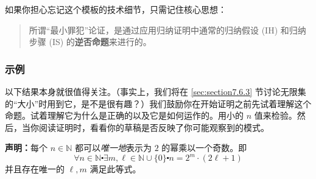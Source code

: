 \setlength{\fboxrule}{2pt}
\setlength\fboxsep{5mm}
\begin{center}
\noindent {}
\end{center}

如果你担心忘记这个模板的技术细节，只需记住核心思想：
\begin{quotation}
    所谓``最小罪犯''论证，是通过应用归纳证明中通常的归纳假设 (IH) 和归纳步骤 (IS) 的\textbf{逆否命题}来进行的。
\end{quotation}

\subsubsection*{示例}

以下结果本身就很值得关注。（事实上，我们将在 \ref{sec:section7.6.3} 节讨论无限集的``大小''时用到它，是不是很有趣？）我们鼓励你在开始证明之前先试着理解这个命题。试着理解它为什么是正确的以及它是如何运作的。用小的 $n$ 值来检验。然后，当你阅读证明时，看看你的草稿是否反映了你可能观察到的模式。\\

\begin{example}[将自然数唯一地表示为乘积]
    
    \textbf{声明：}每个 $n \in \mathbb{N}$ 都可以\emph{唯一地}表示为 $2$ 的幂乘以一个奇数。即
    \[\forall n \in \mathbb{N} \centerdot \exists m, \ell \in \mathbb{N} \cup \{0\} \centerdot n = 2^m \cdot (2\ell + 1)\]
    并且存在唯一的 $\ell, m$ 满足此等式。
\end{example}

